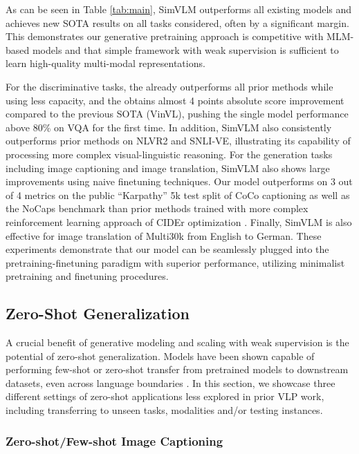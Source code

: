 \documentclass{article} \usepackage{iclr2022_conference,times}
\newcommand{\ours}{SimVLM}
\begin{document}
As can be seen in Table \ref{tab:main}, {\ours} outperforms all existing models and achieves new SOTA results on all tasks considered, often by a significant margin. 
This demonstrates our generative pretraining approach is competitive with MLM-based models and that simple framework with weak supervision is sufficient to learn high-quality multi-modal representations.

For the discriminative tasks,
the  already outperforms all prior methods while using less capacity, and the  obtains almost 4 points absolute score improvement compared to the previous SOTA (VinVL), pushing the single model performance above 80\% on VQA for the first time.
In addition, {\ours} also consistently outperforms prior methods on NLVR2 and SNLI-VE,
illustrating its capability of processing more complex visual-linguistic reasoning.
For the generation tasks including image captioning and image translation, {\ours} also shows large improvements using naive finetuning techniques.
Our model outperforms on 3 out of 4 metrics on the public ``Karpathy'' 5k test split of CoCo captioning as well as the NoCaps benchmark than prior methods trained with more complex reinforcement learning approach of CIDEr optimization \citep{rennie2017self}.
Finally, {\ours} is also effective for image translation of Multi30k from English to German. These experiments demonstrate that our model can be seamlessly plugged into the pretraining-finetuning paradigm with superior performance, utilizing minimalist pretraining and finetuning procedures.

\subsection{Zero-Shot Generalization}

A crucial benefit of generative modeling and scaling with weak supervision is the potential of zero-shot generalization.
Models \citep{brown2020language,radford2021learning,jia2021scaling} have been shown capable of performing few-shot or zero-shot transfer from pretrained models to downstream datasets,
even across language boundaries \citep{lample2019cross}.
In this section,
we showcase three different settings of zero-shot applications less explored in prior VLP work,
including transferring to unseen tasks, modalities and/or testing instances.


\subsubsection{Zero-shot/Few-shot Image Captioning}
\end{document}
